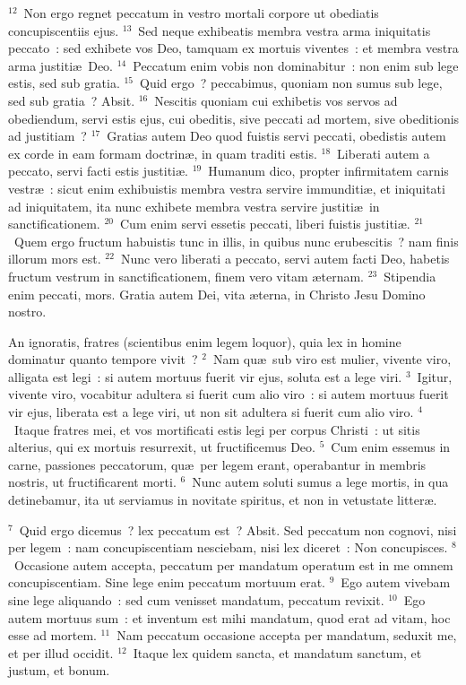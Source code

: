 ${}^{12}$~Non ergo regnet peccatum in vestro mortali corpore ut obediatis concupiscentiis ejus.
${}^{13}$~Sed neque exhibeatis membra vestra arma iniquitatis peccato~: sed exhibete vos Deo, tamquam ex mortuis viventes~: et membra vestra arma justiti\ae\ Deo.
${}^{14}$~Peccatum enim vobis non dominabitur~: non enim sub lege estis, sed sub gratia.
${}^{15}$~Quid ergo~? peccabimus, quoniam non sumus sub lege, sed sub gratia~? Absit.
${}^{16}$~Nescitis quoniam cui exhibetis vos servos ad obediendum, servi estis ejus, cui obeditis, sive peccati ad mortem, sive obeditionis ad justitiam~?
${}^{17}$~Gratias autem Deo quod fuistis servi peccati, obedistis autem ex corde in eam formam doctrin\ae , in quam traditi estis.
${}^{18}$~Liberati autem a peccato, servi facti estis justiti\ae .
${}^{19}$~Humanum dico, propter infirmitatem carnis vestr\ae~: sicut enim exhibuistis membra vestra servire immunditi\ae , et iniquitati ad iniquitatem, ita nunc exhibete membra vestra servire justiti\ae\ in sanctificationem.
${}^{20}$~Cum enim servi essetis peccati, liberi fuistis justiti\ae .
${}^{21}$~Quem ergo fructum habuistis tunc in illis, in quibus nunc erubescitis~? nam finis illorum mors est.
${}^{22}$~Nunc vero liberati a peccato, servi autem facti Deo, habetis fructum vestrum in sanctificationem, finem vero vitam \ae ternam.
${}^{23}$~Stipendia enim peccati, mors. Gratia autem Dei, vita \ae terna, in Christo Jesu Domino nostro.

\lettrine[lines=10,image=true,loversize=0.05,lraise=-0.03]{A}{}n ignoratis, fratres (scientibus enim legem loquor), quia lex in homine dominatur quanto tempore vivit~?
${}^{2}$~Nam qu\ae\ sub viro est mulier, vivente viro, alligata est legi~: si autem mortuus fuerit vir ejus, soluta est a lege viri.
${}^{3}$~Igitur, vivente viro, vocabitur adultera si fuerit cum alio viro~: si autem mortuus fuerit vir ejus, liberata est a lege viri, ut non sit adultera si fuerit cum alio viro.
${}^{4}$~Itaque fratres mei, et vos mortificati estis legi per corpus Christi~: ut sitis alterius, qui ex mortuis resurrexit, ut fructificemus Deo.
${}^{5}$~Cum enim essemus in carne, passiones peccatorum, qu\ae\ per legem erant, operabantur in membris nostris, ut fructificarent morti.
${}^{6}$~Nunc autem soluti sumus a lege mortis, in qua detinebamur, ita ut serviamus in novitate spiritus, et non in vetustate litter\ae .


${}^{7}$~Quid ergo dicemus~? lex peccatum est~? Absit. Sed peccatum non cognovi, nisi per legem~: nam concupiscentiam nesciebam, nisi lex diceret~: Non concupisces.
${}^{8}$~Occasione autem accepta, peccatum per mandatum operatum est in me omnem concupiscentiam. Sine lege enim peccatum mortuum erat.
${}^{9}$~Ego autem vivebam sine lege aliquando~: sed cum venisset mandatum, peccatum revixit.
${}^{10}$~Ego autem mortuus sum~: et inventum est mihi mandatum, quod erat ad vitam, hoc esse ad mortem.
${}^{11}$~Nam peccatum occasione accepta per mandatum, seduxit me, et per illud occidit.
${}^{12}$~Itaque lex quidem sancta, et mandatum sanctum, et justum, et bonum.


